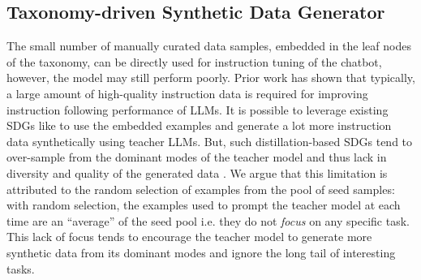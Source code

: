 \subsection{Taxonomy-driven Synthetic Data Generator}\label{sec:sdg}

The small number of manually curated data samples, embedded in the leaf nodes of the taxonomy, can be directly used for instruction tuning of the chatbot, however, the model may still perform poorly. Prior work \citep{humpback} has shown that typically, a large amount of high-quality instruction data is required for improving instruction following performance of LLMs. It is possible to leverage existing SDGs like \cite{wang2023selfinstructaligning, alpaca} to use the embedded examples and generate a lot more instruction data synthetically using teacher LLMs. But, such distillation-based SDGs tend to over-sample from the dominant modes of the teacher model and thus lack in diversity and quality of the generated data \cite{gudibande2023false}. 
We argue that this limitation is attributed to the random selection of examples from the pool of seed samples: with random selection, the examples used to prompt the teacher model at each time are an ``average'' of the seed pool i.e. they do not \emph{focus} on any specific task. This lack of focus tends to encourage the teacher model to generate more synthetic data from its dominant modes and ignore the long tail of interesting tasks.

